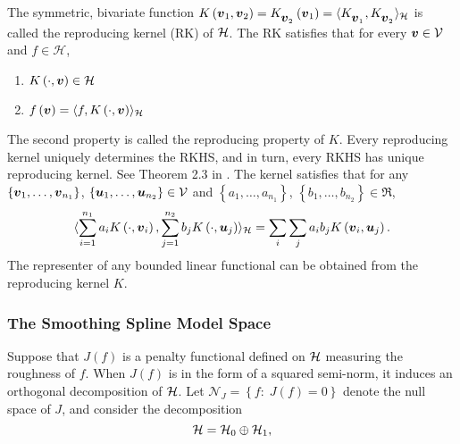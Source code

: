 \bigskip

The symmetric, bivariate function $K\left(\mbox{\boldmath $v$}_1, \mbox{\boldmath $v$}_2 \right) = K_{_{\mbox{\boldmath $v$}_2 }}\left(\mbox{\boldmath $v$}_1\right) = \langle K_{_{\mbox{\boldmath $v$}_1}}, K_{_{\mbox{\boldmath $v$}_2}} \rangle_{\mathcal{H}}$ is called the reproducing kernel (RK) of $\mathcal{H}$. The RK satisfies that for every $\mbox{\boldmath $v$} \in \mathcal{V}$ and $f \in \mathcal{H}$,

\begin{enumerate}
\item $K\left(\cdot, \mbox{\boldmath $v$} \right) \in \mathcal{H}$ 
\item $f\left(\mbox{\boldmath $v$}\right) = \langle f, K\left(\cdot, \mbox{\boldmath $v$}\right)\rangle_{\mathcal{H}}$\label{rkhs-reproducing-property}
\end{enumerate}
\noindent
The second property is called the reproducing property of $K$. Every reproducing kernel uniquely determines the RKHS, and in turn, every RKHS has unique reproducing kernel. See Theorem 2.3 in \cite{gu2013smoothing}. The kernel satisfies that for any $\left\{\mbox{\boldmath $v$}_1,\dots, \mbox{\boldmath $v$}_{n_1}\right\}$, $\left\{{\mbox{\boldmath $u$}}_1,\dots, {\mbox{\boldmath $u$}}_{n_2}\right\} \in \mathcal{V}$ and $\left\{a_1,\dots, a_{n_1}\right\}$, $\left\{b_1,\dots, b_{n_2}\right\} \in \Re$,
\begin{equation}
 \langle\sum_{i = 1}^{n_1} a_i K\left(\cdot, \mbox{\boldmath $v$}_i\right), \sum_{j = 1}^{n_2} b_j K\left(\cdot, {\mbox{\boldmath $u$}}_j\right) \rangle_{\mathcal{H}} = \sum_i \sum_j a_ib_j K\left(\mbox{\boldmath $v$}_i ,\mbox{\boldmath $u$}_j\right).
\end{equation}
\noindent
The representer of any bounded linear functional can be obtained from the reproducing kernel $K$. 


\subsubsection{The Smoothing Spline Model Space}

Suppose that $J\left(f\right)$ is a penalty functional defined on $\mathcal{H}$ measuring the roughness of $f$. When $J\left(f\right)$ is in the form of a squared semi-norm, it induces an orthogonal decomposition of $\mathcal{H}$. Let $\mathcal{N}_J = \left\{ f:\; J\left(f\right) = 0\right\}$ denote the null space of $J$, and consider the decomposition
\[
\mathcal{H} = \mathcal{H}_0 \oplus \mathcal{H}_1,
\]

